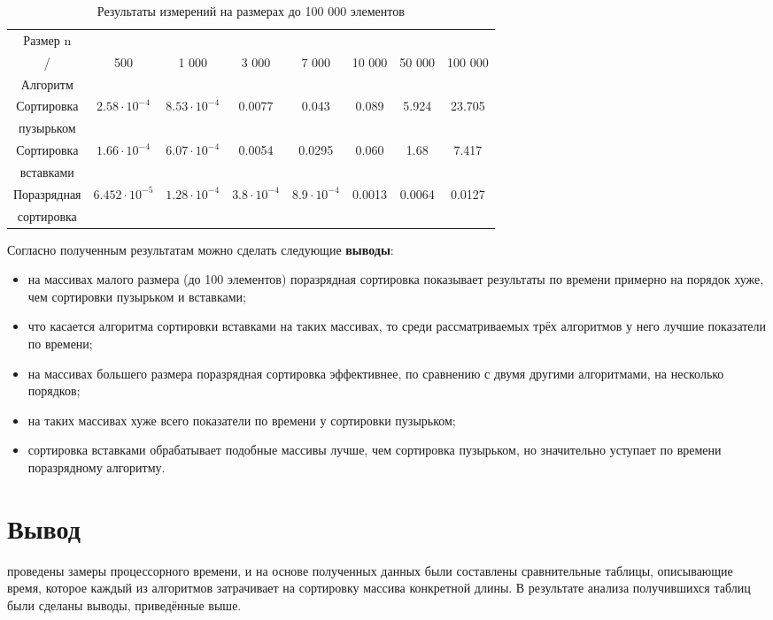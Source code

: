 \newpage

\begin{table}[ph!] \label{table_4_2}
	\caption{Результаты измерений на размерах до 100 000 элементов}
	\centering
	\begin{tabular}{|c|c|c|c|c|c|c|c|}
		\hline
		Размер n&&&&&&&\\
		/    &500 &1 000 & 3 000 & 7 000 & 10 000 & 50 000 & 100 000 \\
		Алгоритм    &&&&&&&\\
		\hline
		Сортировка & $2.58\cdot10^{-4}$ & $8.53\cdot10^{-4}$ & 0.0077 & 0.043 & 0.089 & 5.924 & 23.705\\
		пузырьком &&&&&&&\\
		\hline
		Сортировка & $1.66\cdot10^{-4}$ & $6.07\cdot10^{-4}$ & 0.0054 & 0.0295 & 0.060 & 1.68 & 7.417\\
		вставками &&&&&&&\\
		\hline
		Поразрядная & $6.452\cdot10^{-5}$ & $1.28\cdot10^{-4}$ & $3.8\cdot10^{-4}$ & $8.9\cdot10^{-4}$ & 0.0013 & 0.0064 & 0.0127\\
		сортировка &&&&&&&\\
		\hline
	\end{tabular}
\end{table}

Согласно полученным результатам можно сделать следующие \textbf{выводы}:
\begin{itemize}
	\item на массивах малого размера (до 100 элементов) поразрядная сортировка показывает результаты по времени примерно на порядок хуже, чем сортировки пузырьком и вставками;
	\item что касается алгоритма сортировки вставками на таких массивах, то среди рассматриваемых трёх алгоритмов у него лучшие показатели по времени;
	\item на массивах большего размера поразрядная сортировка эффективнее, по сравнению с двумя другими алгоритмами, на несколько порядков;
	\item на таких массивах хуже всего показатели по времени у сортировки пузырьком;
	\item сортировка вставками обрабатывает подобные массивы лучше, чем сортировка пузырьком, но значительно уступает по времени поразрядному алгоритму.
\end{itemize}

\section*{Вывод}
 проведены замеры процессорного времени, и на основе полученных данных были составлены сравнительные таблицы, описывающие время, которое каждый из алгоритмов затрачивает на сортировку массива конкретной длины. В результате анализа получившихся таблиц были сделаны выводы, приведённые выше.
